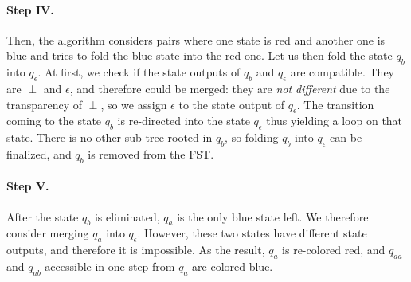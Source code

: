 \paragraph{Step IV.}

Then, the algorithm considers pairs where one state is red and another one is blue and tries to fold the blue state into the red one.
Let us then fold the state $q_b$ into $q_\epsilon$.
At first, we check if the state outputs of $q_b$ and $q_\epsilon$ are compatible.
They are $\perp$ and $\epsilon$, and therefore could be merged: they are \emph{not different} due to the transparency of $\perp$, so we assign $\epsilon$ to the state output of $q_\epsilon$.
The transition coming to the state $q_b$ is re-directed into the state $q_\epsilon$ thus yielding a loop on that state.
There is no other sub-tree rooted in $q_b$, so folding $q_b$ into $q_\epsilon$ can be finalized, and $q_b$ is removed from the FST.

\begin{center}
\end{center}

\paragraph{Step V.}

After the state $q_b$ is eliminated, $q_a$ is the only blue state left.
We therefore consider merging $q_a$ into $q_\epsilon$.
However, these two states have different state outputs, and therefore it is impossible.
As the result, $q_a$ is re-colored red, and $q_{aa}$ and $q_{ab}$ accessible in one step from $q_a$ are colored blue.


\begin{center}
\end{center}

